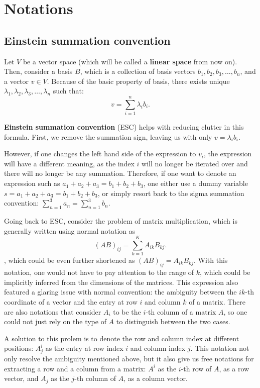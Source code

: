 \chapter{Notations} %
\label{chap:Notations}

\section{Einstein summation convention} %
\label{sec:Einstein summation convention}

Let \( V \) be a vector space (which will be called a \textbf{linear space} from
now on). Then, consider a basis \( B \), which is a collection of basis vectors
\( b_{1}, b_{2}, b_{3}, \ldots, b_n \), and a vector \( v \in V \). Because of
the basic property of basis, there exists unique \( \lambda_{1}, \lambda_{2},
\lambda_{3}, \ldots, \lambda_n \) such that:
\[
  v = \sum_{i=1}^{n} \lambda_i b_i
.\] 

\textbf{Einstein summation convention} (ESC) helps with reducing clutter in
this formula. First, we remove the summation sign, leaving us with only \(
v=\lambda _{i} b _{i} \).

However, if one changes the left hand side of the expression to \( v_{i} \), the
expression will have a different meaning, as the index \( i \) will no longer be
iterated over and there will no longer be any summation. Therefore, if one want
to denote an expression such as \( a_{1}+a_{2}+a_{3}=b_{1}+b_{2}+b_{3} \), one
either use a dummy variable \( s = a_{1}+a_{2}+a_{3}=b_{1}+b_{2}+b_{3} \), or
simply resort back to the sigma summation convention: \( \sum_{n=1}^{3}
a_{n}=\sum_{n=1}^{3} b_{n} \).

Going back to ESC, consider the problem of matrix multiplication, which is
generally written using normal notation as
\[
  (AB)_{ij} = \sum_{k=1}^{K} A_{ik}B_{kj}
.\] , which could be even further shortened as \( (AB)_{ij} = A_{ik}B_{kj} \).
With this notation, one would not have to pay attention to the range of \( k \),
which could be implicitly inferred from the dimensions of the matrices. This
expression also featured a glaring issue with normal convention: the ambiguity
between the \( ik \)-th coordinate of a vector and the entry at row \( i \) and
column \( k \) of a matrix. There are also notations that consider \( A_{i} \)
to be the \( i \)-th column of a matrix \( A \), so one could not just rely on
the type of \( A \) to distinguish between the two cases.

A solution to this prolem is to denote the row and column index at different
positions: \( A^{i}_{j}    \) as the entry at row index \( i \) and column index
\( j \). This notation not only resolve the ambiguity mentioned above, but it
also give us free notations for extracting a row and a column from a matrix: \(
A^{i} \) as the \( i \)-th row of \( A \), as a row vector, and \( A_{j} \) as
the \( j \)-th column of \( A \), as a column vector.

